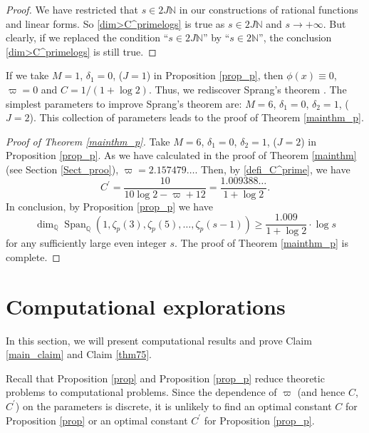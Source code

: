 \documentclass[12pt]{article}
\numberwithin{equation}{section}
\begin{document}
\begin{proof}
We have restricted that $s \in 2J\mathbb{N}$ in our constructions of rational functions and linear forms. So
\eqref{dim>C^primelogs} is true as $s \in 2J\mathbb{N}$ and $s \to +\infty$. But clearly, if we replaced the condition ``$s \in 2J\mathbb{N}$'' by ``$s \in 2\mathbb{N}$'', the conclusion \eqref{dim>C^primelogs} is still true.
\end{proof}

\bigskip

If we take $M=1$, $\delta_1=0$, ($J=1$) in Proposition \ref{prop_p}, then $\phi(x) \equiv 0$, $\varpi = 0$ and $C = 1/(1+\log 2)$. Thus, we rediscover Sprang's theorem \cite{Spr20}. The simplest parameters to improve Sprang's theorem are: $M=6$, $\delta_1=0$, $\delta_2=1$, ($J=2$). This collection of parameters leads to the proof of Theorem \ref{mainthm_p}.

\bigskip

\begin{proof}[Proof of Theorem \ref{mainthm_p}]
Take $M=6$, $\delta_1=0$, $\delta_2=1$, ($J=2$) in Proposition \ref{prop_p}. As we have calculated in the proof of Theorem \ref{mainthm} (see Section \ref{Sect_proo}), $\varpi = 2.157479\ldots$. Then, by \eqref{defi_C^prime}, we have
\[  C^{\prime} =  \frac{10}{10\log 2 - \varpi + 12} = \frac{1.009388\ldots}{1+\log 2}. \]
In conclusion, by Proposition \ref{prop_p} we have
\[  \dim_{\mathbb{Q}}\operatorname{Span}_{\mathbb{Q}}\left( 1,\zeta_p(3),\zeta_p(5),\ldots,\zeta_p(s-1) \right) \geqslant \frac{1.009}{1+\log 2} \cdot \log s
\]
for any sufficiently large even integer $s$. The proof of Theorem \ref{mainthm_p} is complete.
\end{proof}




\section{Computational explorations}\label{Sect_comp}
 
In this section, we will present computational results and prove Claim \ref{main_claim} and Claim \ref{thm75}.

\bigskip

Recall that Proposition \ref{prop} and Proposition \ref{prop_p} reduce theoretic problems to computational problems. Since the dependence of $\varpi$ (and hence $C$, $C^{\prime}$) on the parameters is discrete, it is unlikely to find an optimal constant $C$ for Proposition \ref{prop} or an optimal constant $C^{\prime}$ for Proposition \ref{prop_p}.
\end{document}
